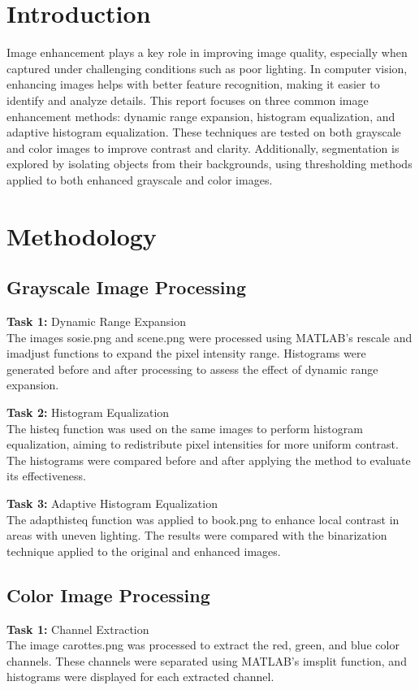 \documentclass[a4paper,12pt]{article}
\begin{document}
\begin{multicols}{2}

\section{Introduction}
Image enhancement plays a key role in improving image quality, especially when captured under challenging conditions such as poor lighting. In computer vision, enhancing images helps with better feature recognition, making it easier to identify and analyze details. This report focuses on three common image enhancement methods: dynamic range expansion, histogram equalization, and adaptive histogram equalization. These techniques are tested on both grayscale and color images to improve contrast and clarity. Additionally, segmentation is explored by isolating objects from their backgrounds, using thresholding methods applied to both enhanced grayscale and color images. 



\section{Methodology}
\subsection{Grayscale Image Processing}
\textbf{Task 1:} Dynamic Range Expansion \\
The images sosie.png and scene.png were processed using MATLAB’s rescale and imadjust functions to expand the pixel intensity range. Histograms were generated before and after processing to assess the effect of dynamic range expansion.

\textbf{Task 2:} Histogram Equalization\\
The histeq function was used on the same images to perform histogram equalization, aiming to redistribute pixel intensities for more uniform contrast. The histograms were compared before and after applying the method to evaluate its effectiveness.

\textbf{Task 3:} Adaptive Histogram Equalization\\
The adapthisteq function was applied to book.png to enhance local contrast in areas with uneven lighting. The results were compared with the binarization technique applied to the original and enhanced images.

\subsection{Color Image Processing}
\textbf{Task 1: } Channel Extraction\\
The image carottes.png was processed to extract the red, green, and blue color channels. These channels were separated using MATLAB’s imsplit function, and histograms were displayed for each extracted channel.


\end{multicols}
\end{document}
